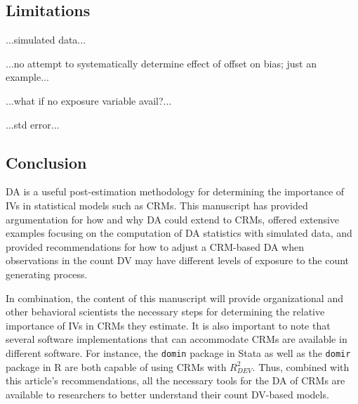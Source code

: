\documentclass[ShortAfour,times,sageapa]{sagej}
\begin{document}
	\subsection{Limitations}
	
	...simulated data...
	
	...no attempt to systematically determine effect of offset on bias; just an example...
	
	...what if no exposure variable avail?...
	
	...std error...
	
	\subsection{Conclusion}
	
	DA is a useful post-estimation methodology for determining the importance of IVs in statistical models such as CRMs.
	This manuscript has provided argumentation for how and why DA could extend to CRMs, offered extensive examples focusing on the computation of DA statistics with simulated data, and provided recommendations for how to adjust a CRM-based DA when observations in the count DV may have different levels of exposure to the count generating process.
	
	In combination, the content of this manuscript will provide organizational and other behavioral scientists the necessary steps for determining the relative importance of IVs in CRMs they estimate.
	It is also important to note that several software implementations that can accommodate CRMs are available in different software.
	For instance, the \texttt{domin} package in Stata \cite{luchman2021determining} as well as the \texttt{domir} package in R \cite{luchman2022package} are both capable of using CRMs with $R^2_{DEV}$. 
	Thus, combined with this article's recommendations, all the necessary tools for the DA of CRMs are available to researchers to better understand their count DV-based models.




	
\end{document}

